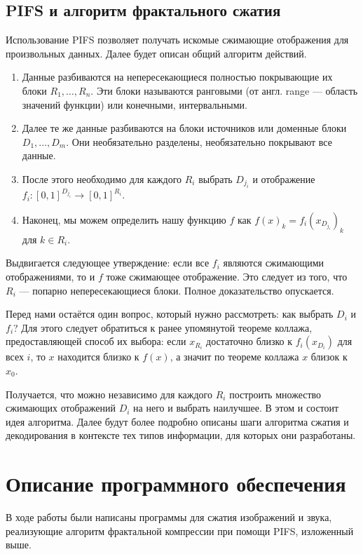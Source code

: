 \documentclass[bachelor,paper]{pmk-graduate}
\theoremstyle{definition}
\begin{document}
\section{PIFS и алгоритм фрактального сжатия}
Использование PIFS позволяет получать искомые сжимающие отображения для произвольных данных. Далее будет описан общий алгоритм действий.
\begin{enumerate}
  \item Данные разбиваются на непересекающиеся полностью покрывающие их блоки $R_1,\dots,R_n$. Эти блоки называются ранговыми (от англ. range --- область значений функции) или конечными, интервальными.
  \item Далее те же данные разбиваются на блоки источников или доменные блоки $D_1,\dots, D_m$. Они необязательно разделены, необязательно покрывают все данные.
  \item После этого необходимо для каждого $R_i$ выбрать $D_{j_i}$ и отображение $f_i: [0,1]^{D_{j_i}}\rightarrow[0,1]^{R_i}$.
  \item Наконец, мы можем определить нашу функцию $f$ как $f(x)_k = f_i(x_{D_{j_i}})_k$ для $k\in R_i$.
\end{enumerate}

Выдвигается следующее утверждение: если все $f_i$ являются сжимающими отображениями, то и $f$ тоже сжимающее отображение. Это следует из того, что $R_i$ --- попарно непересекающиеся блоки. Полное доказательство опускается.

Перед нами остаётся один вопрос, который нужно рассмотреть: как выбрать $D_i$ и $f_i$? Для этого следует обратиться к ранее упомянутой теореме коллажа, предоставляющей способ их выбора: если $x_{R_i}$ достаточно близко к $f_i(x_{D_i})$ для всех $i$, то $x$ находится близко к $f(x)$, а значит по теореме коллажа $x$ близок к $x_0$.

Получается, что можно независимо для каждого $R_i$ построить множество сжимающих отображений $D_i$ на него и выбрать наилучшее. В этом и состоит идея алгоритма. Далее будут более подробно описаны шаги алгоритма сжатия и декодирования в контексте тех типов информации, для которых они разработаны.

\chapter{Описание программного обеспечения}

В ходе работы были написаны программы для сжатия изображений и звука, реализующие алгоритм фрактальной компрессии при помощи PIFS, изложенный выше.
\end{document}
